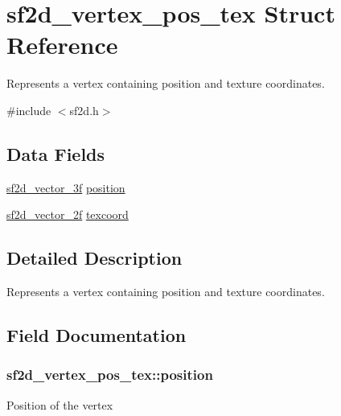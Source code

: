 \hypertarget{structsf2d__vertex__pos__tex}{}\section{sf2d\+\_\+vertex\+\_\+pos\+\_\+tex Struct Reference}
\label{structsf2d__vertex__pos__tex}


Represents a vertex containing position and texture coordinates.  




{\ttfamily \#include $<$sf2d.\+h$>$}

\subsection*{Data Fields}
\begin{DoxyCompactItemize}
\item 
\hyperlink{structsf2d__vector__3f}{sf2d\+\_\+vector\+\_\+3f} \hyperlink{structsf2d__vertex__pos__tex_ae5e85779f0eb3db4b2c26fe77be8cf41}{position}
\item 
\hyperlink{structsf2d__vector__2f}{sf2d\+\_\+vector\+\_\+2f} \hyperlink{structsf2d__vertex__pos__tex_a72fcf7753d1977b813b6e5336c27fce6}{texcoord}
\end{DoxyCompactItemize}


\subsection{Detailed Description}
Represents a vertex containing position and texture coordinates. 

\subsection{Field Documentation}
\hypertarget{structsf2d__vertex__pos__tex_ae5e85779f0eb3db4b2c26fe77be8cf41}{}
\subsubsection[{position}]{ sf2d\+\_\+vertex\+\_\+pos\+\_\+tex\+::position}\label{structsf2d__vertex__pos__tex_ae5e85779f0eb3db4b2c26fe77be8cf41}
Position of the vertex \hypertarget{structsf2d__vertex__pos__tex_a72fcf7753d1977b813b6e5336c27fce6}{}
